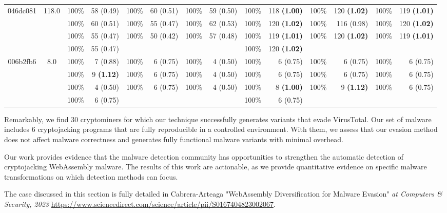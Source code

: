 \begin{adjustbox}{width=1\linewidth}
{\begin{tabular}{c c | cr  cr  cr || cr  cr  cr}
        \hline
   046dc081  &  118.0    &  100\%  & 58 (0.49)   &  100\%  & 60 (0.51)   &  100\%  & 59 (0.50)    &  100\%  & 118 \textbf{(1.00)}    &  100\%  & 120 \textbf{(1.02)}    &  100\%  & 119 \textbf{(1.01)}   \\ &    &  100\%  & 60 (0.51)   &  100\%  & 55 (0.47)   &  100\%  & 62 (0.53)    &  100\%  & 120 \textbf{(1.02)}    &  100\%  & 116 (0.98)   &  100\%  & 120 \textbf{(1.02)}   \\ &    &  100\%  & 55 (0.47)   &  100\%  & 50 (0.42)   &  100\%  & 57 (0.48)    &  100\%  & 119 \textbf{(1.01)}    &  100\%  & 120 \textbf{(1.02)}    &  100\%  & 119 \textbf{(1.01)}   \\ &    &  100\%  & 55 (0.47)     &   &  &  &   &  100\%  & 120 \textbf{(1.02)}   \\
        \hline
   006b2fb6  &  8.0    &  100\%  & 7 (0.88)   &  100\%  & 6 (0.75)   &  100\%  & 4 (0.50)    &  100\%  & 6 (0.75)   &  100\%  & 6 (0.75)   &  100\%  & 6 (0.75)  \\ &    &  100\%  & 9 \textbf{(1.12)}    &  100\%  & 6 (0.75)   &  100\%  & 4 (0.50)    &  100\%  & 6 (0.75)   &  100\%  & 6 (0.75)   &  100\%  & 6 (0.75)  \\ &    &  100\%  & 4 (0.50)   &  100\%  & 6 (0.75)   &  100\%  & 4 (0.50)    &  100\%  & 8 \textbf{(1.00)}    &  100\%  & 9 \textbf{(1.12)}    &  100\%  & 6 (0.75)  \\ &    &  100\%  & 6 (0.75)     &   &  &  &  &  100\%  & 6 (0.75)  \\
        \hline
    
        
    \end{tabular}
}
\end{adjustbox}






Remarkably, we find 30 cryptominers for which our technique successfully generates variants that evade VirusTotal.
Our set of malware includes 6 cryptojacking programs that are fully reproducible in a controlled environment. 
With them, we assess that our evasion method does not affect malware correctness and generates fully functional malware variants with minimal overhead.

Our work provides evidence that the malware detection community has opportunities to strengthen the automatic detection of cryptojacking WebAssembly malware. 
The results of this work are actionable, as we provide quantitative evidence on specific malware transformations on which detection methods can focus.


\begin{tcolorbox}[title=Contribution paper,boxrule=1pt,arc=.2em,boxsep=1.0mm]
    The case discussed in this section is fully detailed in Cabrera-Arteaga \etal "WebAssembly Diversification for Malware Evasion"
    \emph{at Computers \& Security, 2023}
    \url{https://www.sciencedirect.com/science/article/pii/S0167404823002067}. 
\end{tcolorbox}
